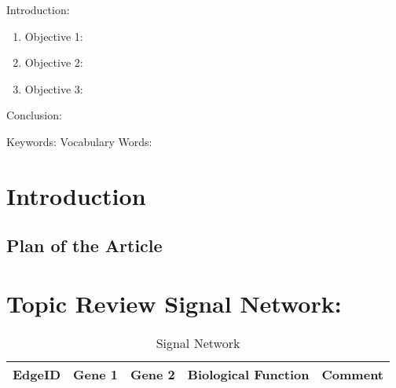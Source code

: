 

\twocolumn
\scriptsize
\begin{frontmatter}
		\title{}
		\author{}
		\address{The Mathematical Learning Space}
\end{frontmatter}	

Introduction:
\begin{enumerate}
\item Objective 1:
\item Objective 2:
\item Objective 3:
\end{enumerate}
Conclusion:

Keywords: 
Vocabulary Words:

\section{Introduction}

\subsection{Plan of the Article}

\section{Topic Review Signal Network:}

\begin{table}[H]
\tiny
\begin{tabular}{p{1cm}p{1cm}p{3cm}p{1cm}p{1cm}} 
EdgeID & Gene 1 & Gene 2 & Biological Function & Comment \\
\hline
\hline
\end{tabular}
\caption{Signal Network}
\label{tab:Table2}
\end{table}

